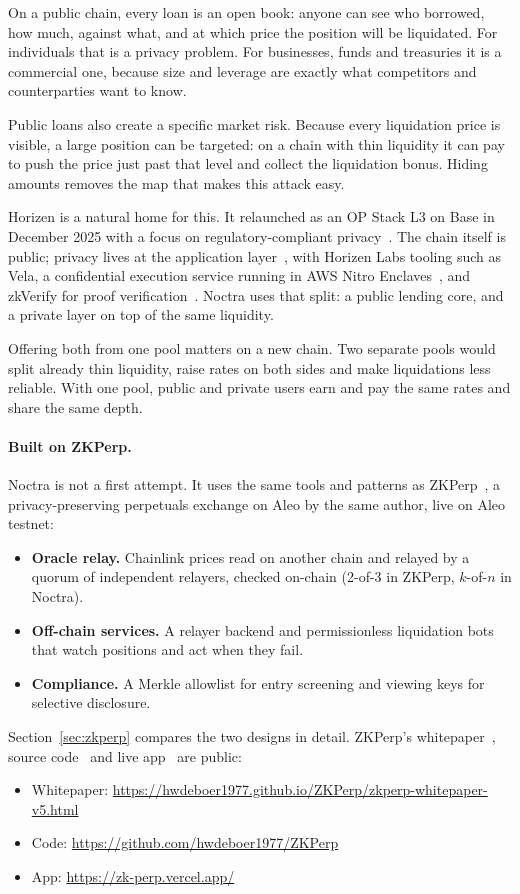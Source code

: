 \documentclass[11pt,a4paper]{article}
\begin{document}
On a public chain, every loan is an open book: anyone can see who borrowed, how much, against what, and at
which price the position will be liquidated. For individuals that is a privacy problem. For businesses, funds
and treasuries it is a commercial one, because size and leverage are exactly what competitors and
counterparties want to know.

Public loans also create a specific market risk. Because every liquidation price is visible, a large position
can be targeted: on a chain with thin liquidity it can pay to push the price just past that level and collect
the liquidation bonus. Hiding amounts removes the map that makes this attack easy.

Horizen is a natural home for this. It relaunched as an OP Stack L3 on Base in December 2025 with a focus on
regulatory-compliant privacy~\citep{theblock2025}. The chain itself is public; privacy lives at the application
layer~\citep{horizen2026,horizenprivacy}, with Horizen Labs tooling such as Vela, a confidential execution
service running in AWS Nitro Enclaves~\citep{veladocs}, and zkVerify for proof verification~\citep{zkverify}. Noctra uses that split: a public lending core, and a private layer on top of
the same liquidity.

Offering both from one pool matters on a new chain. Two separate pools would split already thin liquidity,
raise rates on both sides and make liquidations less reliable. With one pool, public and private users earn and
pay the same rates and share the same depth.

\paragraph{Built on ZKPerp.} Noctra is not a first attempt. It uses the same tools and patterns as
ZKPerp~\citep{zkperp}, a privacy-preserving perpetuals exchange on Aleo by the same author, live on Aleo
testnet:
\begin{itemize}
  \item \textbf{Oracle relay.} Chainlink prices read on another chain and relayed by a quorum of independent
        relayers, checked on-chain (2-of-3 in ZKPerp, $k$-of-$n$ in Noctra).
  \item \textbf{Off-chain services.} A relayer backend and permissionless liquidation bots that watch positions
        and act when they fail.
  \item \textbf{Compliance.} A Merkle allowlist for entry screening and viewing keys for selective disclosure.
\end{itemize}
Section~\ref{sec:zkperp} compares the two designs in detail. ZKPerp's whitepaper~\citep{zkperp}, source
code~\citep{zkperpcode} and live app~\citep{zkperpapp} are public:
\begin{itemize}[itemsep=0pt]
  \item Whitepaper: \url{https://hwdeboer1977.github.io/ZKPerp/zkperp-whitepaper-v5.html}
  \item Code: \url{https://github.com/hwdeboer1977/ZKPerp}
  \item App: \url{https://zk-perp.vercel.app/}
\end{itemize}
\end{document}
